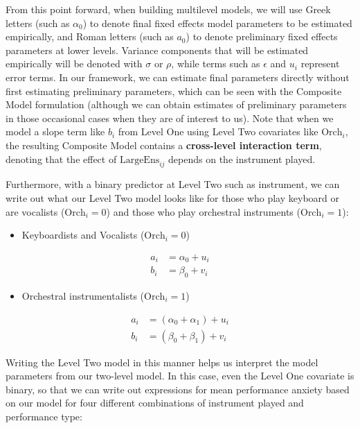 \documentclass[
]{krantz}
\providecommand{\tightlist}{%
  \setlength{\itemsep}{0pt}\setlength{\parskip}{0pt}}
\begin{document}
From this point forward, when building multilevel models, we will use Greek letters (such as \(\alpha_{0}\)) to denote final fixed effects model parameters to be estimated empirically, and Roman letters (such as \(a_{0}\)) to denote preliminary fixed effects parameters at lower levels. Variance components that will be estimated empirically will be denoted with \(\sigma\) or \(\rho\), while terms such as \(\epsilon\) and \(u_{i}\) represent error terms. In our framework, we can estimate final parameters directly without first estimating preliminary parameters, which can be seen with the Composite Model formulation (although we can obtain estimates of preliminary parameters in those occasional cases when they are of interest to us). Note that when we model a slope term like \(b_{i}\) from Level One using Level Two covariates like \(\textrm{Orch}_{i}\), the resulting Composite Model contains a \textbf{cross-level interaction term},  denoting that the effect of \(\textrm{LargeEns}_{ij}\) depends on the instrument played.

Furthermore, with a binary predictor at Level Two such as instrument, we can write out what our Level Two model looks like for those who play keyboard or are vocalists (\(\textrm{Orch}_{i}=0\)) and those who play orchestral instruments (\(\textrm{Orch}_{i}=1\)):

\begin{itemize}
\tightlist
\item
  Keyboardists and Vocalists (\(\textrm{Orch}_{i}=0\))
\end{itemize}

\begin{align*}
a_{i} & = \alpha_{0}+u_{i} \\
b_{i} & = \beta_{0}+v_{i}
\end{align*}

\begin{itemize}
\tightlist
\item
  Orchestral instrumentalists (\(\textrm{Orch}_{i}=1\))
\end{itemize}

\begin{align*}
a_{i} & = (\alpha_{0}+\alpha_{1})+u_{i} \\
b_{i} & = (\beta_{0}+\beta_{1})+v_{i}
\label{eq:level2byorch}
\end{align*}

Writing the Level Two model in this manner helps us interpret the model parameters from our two-level model. In this case, even the Level One covariate is binary, so that we can write out expressions for mean performance anxiety based on our model for four different combinations of instrument played and performance type:
\end{document}
